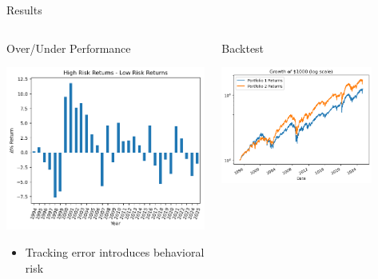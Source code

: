 \documentclass[presentation]{beamer}
\begin{document}
\begin{frame}[label={sec:org2cc18f4}]{Results}
\begin{columns}
\end{columns}
\begin{columns}
\begin{column}{0.4\columnwidth}
\begin{block}{Over/Under Performance}
\begin{center}
\includegraphics[width=.9\linewidth]{./figures/over-under.png}
\end{center}
\begin{itemize}
\item \tiny{Tracking error introduces behavioral risk}
\end{itemize}
\end{block}
\end{column}
\begin{column}{0.5\columnwidth}
\begin{block}{Backtest}
\begin{center}
\includegraphics[width=0.8\textwidth]{./figures/backtest.png}
\end{center}



\end{block}
\end{column}
\end{columns}
\end{frame}
\end{document}
